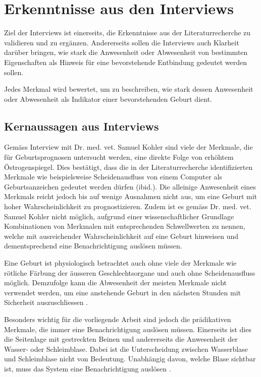 
\section{Erkenntnisse aus den Interviews}

Ziel der Interviews ist einerseits, die Erkenntnisse aus der Literaturrecherche zu validieren und zu ergänzen. Andererseits sollen die Interviews auch Klarheit darüber bringen, wie stark die Anwesenheit oder Abwesenheit von bestimmten Eigenschaften als Hinweis für eine bevorstehende Entbindung gedeutet werden sollen. 

Jedes Merkmal wird bewertet, um zu beschreiben, wie stark dessen Anwesenheit oder Abwesenheit als Indikator einer bevorstehenden Geburt dient.  


\subsection{Kernaussagen aus Interviews}
Gemäss Interview mit Dr. med. vet. Samuel Kohler \citep{Kohler2020} sind viele der Merkmale, die für Geburtsprognosen untersucht werden, eine direkte Folge von erhöhtem Östrogenspiegel. Dies bestätigt, dass die in der Literaturrecherche identifizierten Merkmale wie beispielsweise Scheidenausfluss von einem Computer als Geburtsanzeichen gedeutet werden dürfen (ibid.). Die alleinige Anwesenheit eines Merkmals reicht jedoch bis auf wenige Ausnahmen nicht aus, um eine Geburt mit hoher Wahrscheinlichkeit zu prognostizieren. Zudem ist es gemäss Dr. med. vet. Samuel Kohler nicht möglich, aufgrund einer wissenschaftlicher Grundlage Kombinationen von Merkmalen mit entsprechenden Schwellwerten zu nennen, welche mit ausreichender Wahrscheinlichkeit auf eine Geburt hinweisen und dementsprechend eine Benachrichtigung auslösen müssen.

Eine Geburt ist physiologisch betrachtet auch ohne viele der Merkmale wie rötliche Färbung der äusseren Geschlechtsorgane und auch ohne Scheidenausfluss möglich. Demzufolge kann die Abwesenheit der meisten Merkmale nicht verwendet werden, um eine anstehende Geburt in den nächsten Stunden mit Sicherheit auszuschliessen \citep{Kohler2020}. 

Besonders wichtig für die vorliegende Arbeit sind jedoch die prädikativen Merkmale, die immer eine Benachrichtigung auslösen müssen. Einerseits ist dies die Seitenlage mit gestreckten Beinen und andererseits die Anwesenheit der Wasser- oder Schleimblase. Dabei ist die Unterscheidung zwischen Wasserblase und Schleimblase nicht von Bedeutung. Unabhängig davon, welche Blase sichtbar ist, muss das System eine Benachrichtigung auslösen \citep{Kohler2020}.

